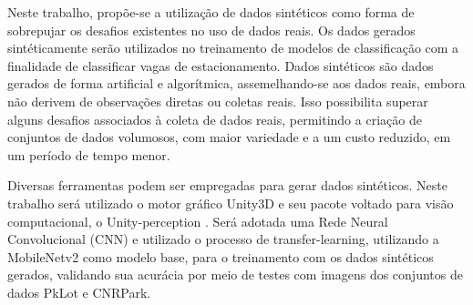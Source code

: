Neste trabalho, propõe-se a utilização de dados sintéticos como forma de sobrepujar os desafios existentes no uso de dados reais. Os dados gerados sintéticamente serão utilizados no treinamento de modelos de classificação com a finalidade de classificar vagas de estacionamento. Dados sintéticos são dados gerados de forma artificial e algorítmica, assemelhando-se aos dados reais, embora não derivem de observações diretas ou coletas reais. Isso possibilita superar alguns desafios associados à coleta de dados reais, permitindo a criação de conjuntos de dados volumosos, com maior variedade e a um custo reduzido, em um período de tempo menor.

Diversas ferramentas podem ser empregadas para gerar dados sintéticos. Neste trabalho será utilizado o motor gráfico Unity3D e seu pacote voltado para visão computacional, o Unity-perception \cite{unity-perception}. Será adotada uma Rede Neural Convolucional (CNN) e utilizado o processo de transfer-learning, utilizando a MobileNetv2 como modelo base, para o treinamento com os dados sintéticos gerados, validando sua acurácia por meio de testes com imagens dos conjuntos de dados PkLot e CNRPark.

